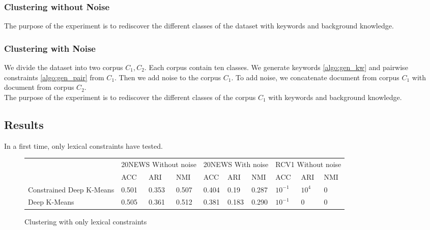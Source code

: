 \subsubsection{\label{section:test1}Clustering without Noise}
The purpose of the experiment is to rediscover the different classes of the
dataset with keywords and background knowledge.

\subsubsection{\label{section:test2}Clustering with Noise}
We divide the dataset into two corpus $C_1, C_2$. Each corpus contain
ten classes. We generate keywords \ref{algo:gen_kw} and pairwise
constraints \ref{algo:gen_pair} from $C_1$. Then we add noise to the corpus
$C_1$. To add noise, we concatenate document from corpus $C_1$ with document
from corpus $C_2$.
\\The purpose of the experiment is to rediscover the different classes of the
corpus $C_1$ with keywords and background knowledge.

\subsection{Results}
In a first time, only lexical constraints have tested.
\begin{figure}[!h]
  \centering
  \begin{tabular}{| l | l | l | l | l | l | l | l | l | l | }
    \hline
    & \multicolumn{3}{|c|}{20NEWS Without noise} & \multicolumn{3}{|c|}{20NEWS With noise} & \multicolumn{3}{|c|}{RCV1 Without noise}  \\
    & ACC &ARI & NMI & ACC & ARI &NMI &ACC & ARI &NMI  \\ \hline
    Constrained Deep K-Means & 0.501& 0.353 & 0.507 & 0.404& 0.19 & 0.287 & $10^{-1}$ & $10^{4}$ & 0 \\ \hline
    Deep K-Means& 0.505 & 0.361 & 0.512 & 0.381 & 0.183 & 0.290 &   $10^{-1}$ & 0 & 0 \\ \hline
  \end{tabular}
\caption{\label{tab1}Clustering with only lexical constraints}
\end{figure}
